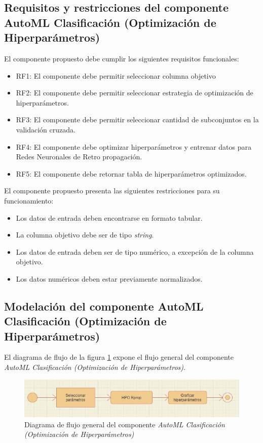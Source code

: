 \subsection{Requisitos y restricciones del componente AutoML Clasificación (Optimización de Hiperparámetros)}
El componente propuesto debe cumplir los siguientes requisitos funcionales:

\begin{itemize}
	\item RF1: El componente debe permitir seleccionar columna objetivo
	\item RF2: El componente debe permitir seleccionar estrategia de optimización de hiperparámetros.
	\item RF3: El componente debe permitir seleccionar cantidad de subconjuntos en la validación cruzada.
	\item RF4: El componente debe optimizar hiperparámetros y entrenar datos para Redes Neuronales de Retro propagación.
	\item RF5: El componente debe retornar tabla de hiperparámetros optimizados.
\end{itemize}

El componente propuesto presenta las siguientes restricciones para su funcionamiento:

\begin{itemize}
	\item Los datos de entrada deben encontrarse en formato tabular.
	\item La columna objetivo debe ser de tipo \textit{string}.
	\item Los datos de entrada deben ser de tipo numérico, a excepción de la columna objetivo.
	\item Los datos numéricos deben estar previamente normalizados.
\end{itemize}

\subsection{Modelación del componente AutoML Clasificación (Optimización de Hiperparámetros)}
El diagrama de flujo de la figura \ref{fig:diagrama-flujo-gral-comp-hpo} expone el flujo general del componente \textit{AutoML Clasificación (Optimización de Hiperparámetros)}.

\begin{figure}[H]
	\centering
	\includegraphics[width=0.7\linewidth]{"figuras/capi 2/diagrama-flujo-gral-comp-hpo"}
	\caption[Diagrama de flujo general del componente AutoML Clasificación (Optimización de Hiperparámetros)]{Diagrama de flujo general del componente \textit{AutoML Clasificación (Optimización de Hiperparámetros)}}
	\label{fig:diagrama-flujo-gral-comp-hpo}
\end{figure}

